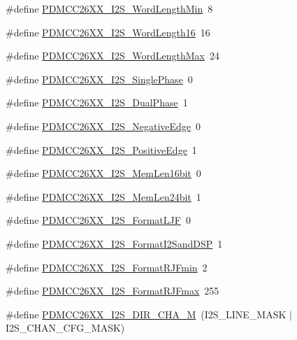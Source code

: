 \begin{DoxyCompactItemize}
\item 
\#define \hyperlink{_p_d_m_c_c26_x_x__util_8h_af6b394e2eac2812d14d58c62b31467ad}{P\+D\+M\+C\+C26\+X\+X\+\_\+\+I2\+S\+\_\+\+Word\+Length\+Min}~8
\item 
\#define \hyperlink{_p_d_m_c_c26_x_x__util_8h_ab4eded8479e91228d09d210a067c752f}{P\+D\+M\+C\+C26\+X\+X\+\_\+\+I2\+S\+\_\+\+Word\+Length16}~16
\item 
\#define \hyperlink{_p_d_m_c_c26_x_x__util_8h_a516ce5fd2b154e2cc487ff73c03f5f07}{P\+D\+M\+C\+C26\+X\+X\+\_\+\+I2\+S\+\_\+\+Word\+Length\+Max}~24
\item 
\#define \hyperlink{_p_d_m_c_c26_x_x__util_8h_aa3869a39dc817d8297a1fffd77568d39}{P\+D\+M\+C\+C26\+X\+X\+\_\+\+I2\+S\+\_\+\+Single\+Phase}~0
\item 
\#define \hyperlink{_p_d_m_c_c26_x_x__util_8h_acbd5c34905fd0866315e4065e934248e}{P\+D\+M\+C\+C26\+X\+X\+\_\+\+I2\+S\+\_\+\+Dual\+Phase}~1
\item 
\#define \hyperlink{_p_d_m_c_c26_x_x__util_8h_a1ccf47516280b04346af4f57d5bc743d}{P\+D\+M\+C\+C26\+X\+X\+\_\+\+I2\+S\+\_\+\+Negative\+Edge}~0
\item 
\#define \hyperlink{_p_d_m_c_c26_x_x__util_8h_af5b4926b849db9bb23a24b3807a3380a}{P\+D\+M\+C\+C26\+X\+X\+\_\+\+I2\+S\+\_\+\+Positive\+Edge}~1
\item 
\#define \hyperlink{_p_d_m_c_c26_x_x__util_8h_a636b307f107609c5ed33408388f92cbb}{P\+D\+M\+C\+C26\+X\+X\+\_\+\+I2\+S\+\_\+\+Mem\+Len16bit}~0
\item 
\#define \hyperlink{_p_d_m_c_c26_x_x__util_8h_ac3e46840c6ebbd42ce8020f30cb2245f}{P\+D\+M\+C\+C26\+X\+X\+\_\+\+I2\+S\+\_\+\+Mem\+Len24bit}~1
\item 
\#define \hyperlink{_p_d_m_c_c26_x_x__util_8h_a5dbd78db575466a7afd1a579b9d3bef2}{P\+D\+M\+C\+C26\+X\+X\+\_\+\+I2\+S\+\_\+\+Format\+L\+J\+F}~0
\item 
\#define \hyperlink{_p_d_m_c_c26_x_x__util_8h_ae67f83d561b7bdb5441f21c7aa1577f8}{P\+D\+M\+C\+C26\+X\+X\+\_\+\+I2\+S\+\_\+\+Format\+I2\+Sand\+D\+S\+P}~1
\item 
\#define \hyperlink{_p_d_m_c_c26_x_x__util_8h_ac5fe3ebd081f4e3bd650cf3f09a50523}{P\+D\+M\+C\+C26\+X\+X\+\_\+\+I2\+S\+\_\+\+Format\+R\+J\+Fmin}~2
\item 
\#define \hyperlink{_p_d_m_c_c26_x_x__util_8h_af782ae465f8903ee8349e27f27d172dc}{P\+D\+M\+C\+C26\+X\+X\+\_\+\+I2\+S\+\_\+\+Format\+R\+J\+Fmax}~255
\item 
\#define \hyperlink{_p_d_m_c_c26_x_x__util_8h_a3105b54f425f7b4f8bdbef8cdab85432}{P\+D\+M\+C\+C26\+X\+X\+\_\+\+I2\+S\+\_\+\+D\+I\+R\+\_\+\+C\+H\+A\+\_\+\+M}~(I2\+S\+\_\+\+L\+I\+N\+E\+\_\+\+M\+A\+S\+K $\vert$ I2\+S\+\_\+\+C\+H\+A\+N\+\_\+\+C\+F\+G\+\_\+\+M\+A\+S\+K)
\end{DoxyCompactItemize}
